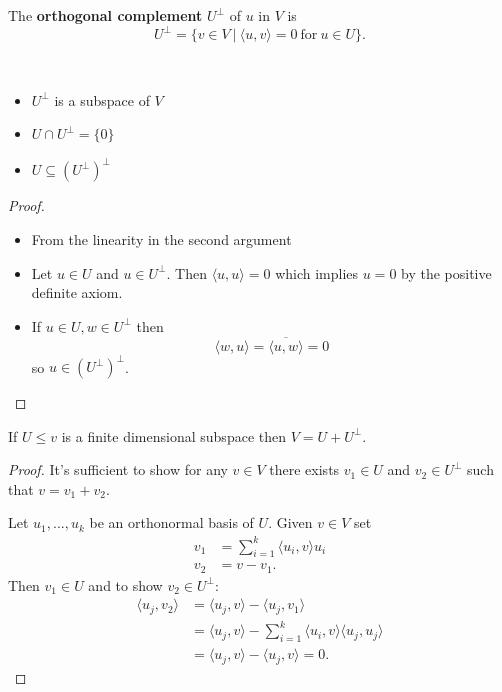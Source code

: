 \begin{definition}
  The {\bf orthogonal complement} $U^\perp$ of $u$ in $V$ is
  \[U^\perp = \{ v \in V \ | \ \langle u, v \rangle = 0 \ \text{for} \ u \in U \}.\]
\end{definition}

\begin{prop} $ $

  \begin{itemize}
    \item $U^\perp$ is a subspace of $V$
    \item $U \cap U^\perp = \{0\}$
    \item $U \subseteq (U^\perp)^\perp$
  \end{itemize}
\end{prop}
\begin{proof} $ $

   \begin{itemize}
     \item From the linearity in the second argument
     \item Let $u \in U$ and $u \in U^\perp$. Then $\langle u, u \rangle = 0$ which implies $u=0$ by the positive definite axiom.
     \item If $u \in U, w \in U^\perp$ then
       \[\langle w, u \rangle = \overline{\langle u, w \rangle} = 0\]
       so $u \in (U^\perp)^\perp$.
   \end{itemize} 
\end{proof}

\begin{theorem}
    If $U \leq v$ is a finite dimensional subspace then $V = U + U^\perp$.
\end{theorem}
\begin{proof}
    It's sufficient to show for any $v \in V$ there exists $v_1 \in U$ and $v_2 \in U^\perp$ such that $v = v_1 + v_2$.
    
    \noindent Let $u_1,...,u_k$ be an orthonormal basis of $U$. Given $v \in V$ set
    \begin{align*}
      v_1 &= \sum_{ i = 1}^{k} \langle u_i, v \rangle u_i \\
      v_2 &= v - v_1
    .\end{align*}
    Then $v_1 \in U$ and to show $v_2 \in U^\perp$:
    \begin{align*}
      \langle u_j, v_2 \rangle &= \langle u_j, v \rangle - \langle u_j, v_1 \rangle \\
       &= \langle u_j, v \rangle - \sum_{ i = 1}^{k} \langle u_i, v \rangle \langle u_j, u_j \rangle \\
       &= \langle u_j, v \rangle - \langle u_j, v \rangle = 0
    .\end{align*}
\end{proof}

